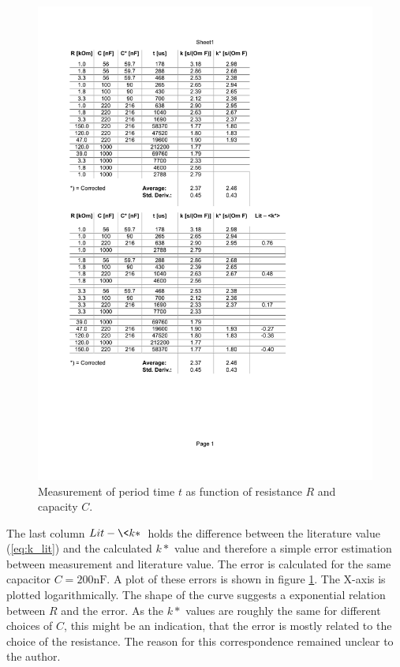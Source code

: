 \documentclass[journal]{IEEEtran}
\begin{document}
\begin{figure}
  \centering
   \includegraphics[trim=50mm 90mm 45mm 125mm, clip,
   width=\columnwidth,page=2]{results/am_data.pdf}
   \caption{Measurement of period time $t$ as function of resistance $R$ and
   capacity $C$.}
   \label{fig:am_plot}
\end{figure}

The last column $Lit - \<k*\>$ holds the difference between the literature value
(\ref{eq:k_lit}) and the calculated $k*$ value and therefore a simple error
estimation between measurement and literature value. The error is calculated for
the same capacitor $C = 200\text{nF}$. A plot of these errors is shown in figure
\ref{fig:am_plot}. The X-axis is plotted logarithmically. The shape of the curve
suggests a exponential relation between $R$ and the error. As the $k*$ values
are roughly the same for different choices of $C$, this might be an indication,
that the error is mostly related to the choice of the resistance. The reason for
this correspondence remained unclear to the author.
\end{document}
